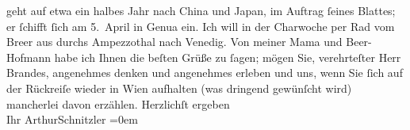 \begin{ledgroupsized}[t]{13cm}
               geht auf etwa ein halbes Jahr nach China und Japan, im Auftrag ſeines Blattes; er ſchifft ſich am 5. April in Genua ein. Ich will in der Charwoche per Rad vom Bre{\geminationn}er aus durchs
                  Ampezzothal nach Venedig.\pend
           \pstart
           Von meiner Mama und Beer-Hofmann habe ich Ihnen die beſten Grüße zu
               ſagen; {\pb}mögen Sie, verehrteſter Herr Brandes,
               angenehmes denken und angenehmes erleben und uns, wenn Sie ſich auf der Rückreiſe
               wieder in Wien aufhalten (was dringend gewünſcht
               wird) mancherlei davon erzählen.\pend
           \pstart
           Herzlichſt ergeben{\\[\baselineskip]}Ihr \spacefill\mbox{ArthurSchnitzler}\pend
           \leftskip=0em{}\endnumbering{}\end{ledgroupsized}  \newcommand{\dateiname}{L00787}\newcommand{\titel}{Arthur Schnitzler an Georg Brandes, 27. 3. 1898}\newcommand{\editorInnen}{Martin Anton Müller und Gerd-Hermann Susen}
            \footnotesize
\begin{ledgroupsized}[t]{11.5cm}
\end{ledgroupsized}
         
      